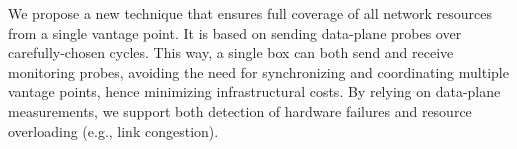 We propose a new technique that ensures full coverage of all network resources from a
single vantage point. It is based on sending data-plane probes over carefully-chosen cycles. This way, a single box can both
send and receive monitoring probes, avoiding the need for synchronizing and coordinating multiple vantage points, hence
minimizing infrastructural costs. By relying on data-plane measurements, we support both detection of hardware failures and resource overloading (e.g., link congestion).

% 


